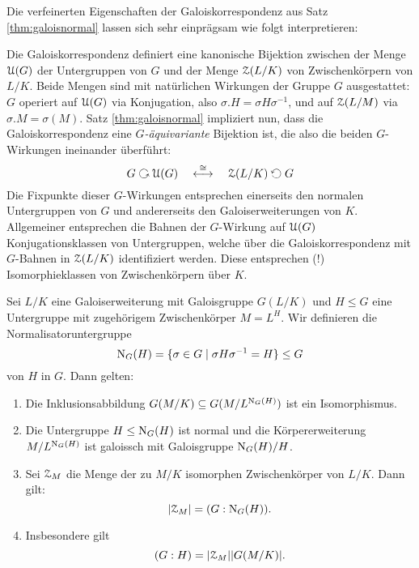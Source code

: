 \documentclass{book}
\begin{document}
\begin{rem}
    \label{rem:galoisoperation}
    Die verfeinerten Eigenschaften der Galoiskorrespondenz aus Satz
    \ref{thm:galoisnormal} lassen sich sehr einprägsam wie folgt
    interpretieren: 

    Die Galoiskorrespondenz definiert eine kanonische Bijektion
    zwischen der Menge $\EuScript{U}(G)$ der Untergruppen von $G$ und der Menge
    $\EuScript{Z}(L/K)$ von Zwischenkörpern von $L/K$. Beide Mengen sind mit natürlichen
    Wirkungen der Gruppe $G$ ausgestattet: $G$ operiert auf $\EuScript{U}(G)$ via
    Konjugation, also $\sigma.H = \sigma H \sigma^{-1}$, und auf $\EuScript{Z}(L/M)$ via
    $\sigma.M = \sigma(M)$. 
    Satz \ref{thm:galoisnormal} impliziert nun, dass die Galoiskorrespondenz eine 
    \emph{$G$-äquivariante} Bijektion ist, die also die beiden $G$-Wirkungen
    ineinander überführt: 
    \[
        G \actson \eU(G) \quad \overset{\cong}{\longleftrightarrow} \quad \eZ(L/K) \actsonright G
    \]
    Die Fixpunkte dieser $G$-Wirkungen entsprechen
    einerseits den normalen Untergruppen von $G$ und andererseits den
    Galoiserweiterungen von $K$. Allgemeiner entsprechen die Bahnen der
    $G$-Wirkung auf $\EuScript{U}(G)$ Konjugationsklassen von Untergruppen, welche über
    die Galoiskorrespondenz mit $G$-Bahnen in $\EuScript{Z}(L/K)$ identifiziert werden.
    Diese entsprechen (!) Isomorphieklassen von Zwischenkörpern über $K$. 
\end{rem}

\begin{prob}
    \label{prob:verfeinerung}
    Sei $L/K$ eine Galoiserweiterung mit Galoisgruppe $G(L/K)$ und $H \le G$
    eine Untergruppe mit zugehörigem Zwischenkörper $M = L^H$. Wir definieren
    die Normalisatoruntergruppe 
    \[
        \operatorname{N}_G(H) = \{ \sigma \in G \; | \; \sigma H \sigma^{-1} = H \} \le G
    \]
    von $H$ in $G$. Dann gelten:
    \begin{enumerate}
        \item Die Inklusionsabbildung $G(M/K) \subseteq G(M/L^{\operatorname{N}_G(H)})$ ist ein Isomorphismus. 
        \item Die Untergruppe $H \le \operatorname{N}_G(H)$ ist normal und die
            Körpererweiterung $M/L^{\operatorname{N}_G(H)}$ ist galoissch mit Galoisgruppe
            $\operatorname{N}_G(H)/H$. 
        \item Sei $\EuScript{Z}_M$ die Menge der zu $M/K$ isomorphen
            Zwischenkörper von $L/K$. Dann gilt: 
            \[
                |\EuScript{Z}_M| = (G:\operatorname{N}_G(H)).
            \]
        \item Insbesondere gilt
            \[
                (G:H) = |\EuScript{Z}_M| |G(M/K)|.
            \]
    \end{enumerate}
\end{prob}
\end{document}
